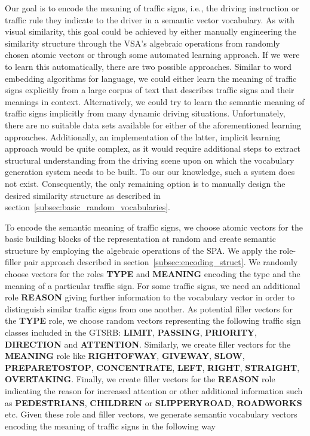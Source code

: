 Our goal is to encode the meaning of traffic signs, i.e., the driving instruction or traffic rule they indicate to the driver in a semantic vector vocabulary.
As with visual similarity, this goal could be achieved by either manually engineering the similarity structure through the \ac{VSA}'s algebraic operations from randomly chosen atomic vectors or through some automated learning approach.
If we were to learn this automatically, there are two possible approaches. 
Similar to word embedding algorithms for language, we could either learn the meaning of traffic signs explicitly from a large  corpus of text that describes traffic signs and their meanings in context.
Alternatively, we could try to learn the semantic meaning of traffic signs implicitly from many dynamic driving situations.
Unfortunately, there are no suitable data sets available for either of the aforementioned learning approaches.
Additionally, an implementation of the latter, implicit learning approach would be quite complex, as it would require additional steps to extract structural understanding from the driving scene upon on which the vocabulary generation system needs to be built.
To our our knowledge, such a system does not exist.
Consequently, the only remaining option is to manually design the desired similarity structure as described in section~\ref{subsec:basic_random_vocabularies}.

To encode the semantic meaning of traffic signs, we choose atomic vectors for the basic building blocks of the representation at random and create semantic structure by employing the algebraic operations of the \ac{SPA}.
We apply the role-filler pair approach described in section~\ref{subsec:encoding_struct}.
We randomly choose vectors for the roles \textbf{TYPE} and \textbf{MEANING} encoding the type and the meaning of a particular traffic sign.
For some traffic signs, we need an additional role \textbf{REASON} giving further information to the vocabulary vector in order to distinguish similar traffic signs from one another.
As potential filler vectors for the \textbf{TYPE} role, we choose random vectors representing the following traffic sign classes included in the \ac{GTSRB}: \textbf{LIMIT}, \textbf{PASSING}, \textbf{PRIORITY}, \textbf{DIRECTION} and \textbf{ATTENTION}.
Similarly, we create filler vectors for the \textbf{MEANING} role like \textbf{RIGHTOFWAY}, \textbf{GIVEWAY}, \textbf{SLOW}, \textbf{PREPARETOSTOP}, \textbf{CONCENTRATE}, \textbf{LEFT}, \textbf{RIGHT}, \textbf{STRAIGHT}, \textbf{OVERTAKING}.
Finally, we create filler vectors for the \textbf{REASON} role indicating the reason for increased attention or other additional information such as \textbf{PEDESTRIANS}, \textbf{CHILDREN} or \textbf{SLIPPERYROAD}, \textbf{ROADWORKS} etc.
Given these role and filler vectors, we generate semantic vocabulary vectors encoding the meaning of traffic signs in the following way

